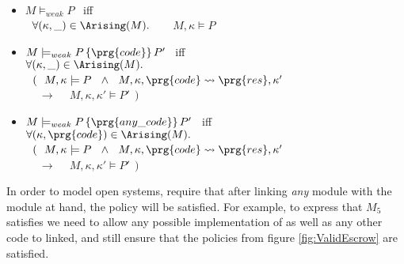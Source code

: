 \begin{definition} ~ ~ %

\begin{itemize}
\item
$M  \models_{weak} P$   \  iff \\ 
$ ~ $ \hspace{.2in}  $\forall ( \kappa,\_ )\in \Arising(M).   $ ~   ~ 
$ M, \kappa \models P$
\item
$M  \models_{weak} P\, \{ \prg{code} \}\, P'$ \  iff \\ 
 $ \forall (\kappa,\_ )\in \Arising(M).$\\
 $ ~ $ \hspace{.2in} 
 $(\ \ M, \kappa \models P\ \ \wedge\  \ M, \kappa, \prg{code}  \leadsto \prg{res}, \kappa' $ \\
  $ ~ $   \hspace{.6in}  $ \ \ \  \longrightarrow $ 
$  \ \ \ \ M, \kappa, \kappa' \models P'\ \ )$
\item
$M  \models_{weak} P\, \{ \prg{any\_code} \}\,  P'  $ \  iff \\ 
 $ \forall (\kappa,\prg{code} )\in \Arising(M).$\\  $ ~ $ \hspace{.2in} 
 $(\ \ M, \kappa \models P\ \ \wedge\  \ M, \kappa, \prg{code}  \leadsto \prg{res}, \kappa' $ \\
  $ ~ $   \hspace{.6in}  $ \ \ \  \longrightarrow $
   $\ \ \ \  M, \kappa, \kappa' \models P'\ \ )$
\end{itemize}
\end{definition}

In order to model open systems, require that after linking {\em any} module  with the module at hand,  the policy will be satisfied. 
For example, to express that $M_5$ satisfies
 we need to allow any possible implementation of  as well as any other 
code to linked, and still ensure that the policies from figure \ref{fig:ValidEscrow} are satisfied.

